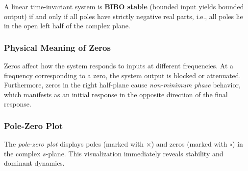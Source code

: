 \begin{theorem}
A linear time-invariant system is \textbf{BIBO stable} (bounded input yields bounded output) if and only if all poles have strictly negative real parts, i.e., all poles lie in the open left half of the complex plane.
\end{theorem}

\subsubsection{Physical Meaning of Zeros}

Zeros affect how the system responds to inputs at different frequencies. At a frequency corresponding to a zero, the system output is blocked or attenuated. Furthermore, zeros in the right half-plane cause \textit{non-minimum phase} behavior, which manifests as an initial response in the opposite direction of the final response.

\subsubsection{Pole-Zero Plot}

The \textit{pole-zero plot} displays poles (marked with $\times$) and zeros (marked with $\circ$) in the complex $s$-plane. This visualization immediately reveals stability and dominant dynamics.

